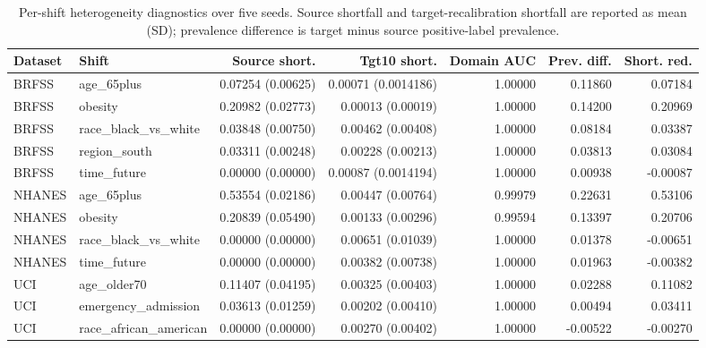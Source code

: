 \begin{table}[!tbp]
\centering
\caption{Per-shift heterogeneity diagnostics over five seeds. Source shortfall and target-recalibration shortfall are reported as mean (SD); prevalence difference is target minus source positive-label prevalence.}
\label{tab:heterogeneity_diagnostics}
\scriptsize
\setlength{\tabcolsep}{3pt}
\begin{adjustbox}{max width=\textwidth}
\begin{tabular}{llrrrrr}
\toprule
Dataset & Shift & Source short. & Tgt10 short. & Domain AUC & Prev. diff. & Short. red. \\
\midrule
BRFSS & age\_65plus & 0.07254 (0.00625) & 0.00071 (0.0014186) & 1.00000 & 0.11860 & 0.07184 \\
BRFSS & obesity & 0.20982 (0.02773) & 0.00013 (0.00019) & 1.00000 & 0.14200 & 0.20969 \\
BRFSS & race\_black\_vs\_white & 0.03848 (0.00750) & 0.00462 (0.00408) & 1.00000 & 0.08184 & 0.03387 \\
BRFSS & region\_south & 0.03311 (0.00248) & 0.00228 (0.00213) & 1.00000 & 0.03813 & 0.03084 \\
BRFSS & time\_future & 0.00000 (0.00000) & 0.00087 (0.0014194) & 1.00000 & 0.00938 & -0.00087 \\
NHANES & age\_65plus & 0.53554 (0.02186) & 0.00447 (0.00764) & 0.99979 & 0.22631 & 0.53106 \\
NHANES & obesity & 0.20839 (0.05490) & 0.00133 (0.00296) & 0.99594 & 0.13397 & 0.20706 \\
NHANES & race\_black\_vs\_white & 0.00000 (0.00000) & 0.00651 (0.01039) & 1.00000 & 0.01378 & -0.00651 \\
NHANES & time\_future & 0.00000 (0.00000) & 0.00382 (0.00738) & 1.00000 & 0.01963 & -0.00382 \\
UCI & age\_older70 & 0.11407 (0.04195) & 0.00325 (0.00403) & 1.00000 & 0.02288 & 0.11082 \\
UCI & emergency\_admission & 0.03613 (0.01259) & 0.00202 (0.00410) & 1.00000 & 0.00494 & 0.03411 \\
UCI & race\_african\_american & 0.00000 (0.00000) & 0.00270 (0.00402) & 1.00000 & -0.00522 & -0.00270 \\
\bottomrule
\end{tabular}
\end{adjustbox}
\end{table}
